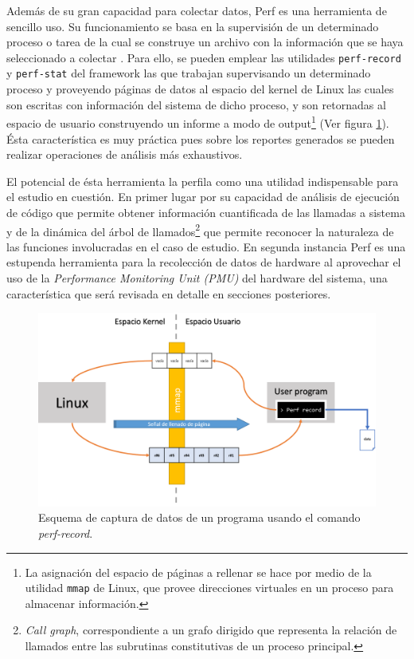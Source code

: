 Además de su gran capacidad para colectar datos, Perf es una herramienta de sencillo uso. Su funcionamiento se basa en la supervisión de un determinado proceso o tarea de la cual se construye un archivo con la información que se haya seleccionado a colectar \cite{article:perf}. Para ello, se pueden emplear las utilidades \verb=perf-record= y \verb=perf-stat= del framework las que trabajan supervisando un determinado proceso y proveyendo páginas de datos al espacio del kernel de Linux las cuales son escritas con información del sistema de dicho proceso, y son retornadas al espacio de usuario construyendo un informe a modo de output\footnote{La asignación del espacio de páginas a rellenar se hace por medio de la utilidad \verb=mmap= de Linux, que provee direcciones virtuales en un proceso para almacenar información.} (Ver figura \ref{fig:perfRecord}). Ésta característica es muy práctica pues sobre los reportes generados se pueden realizar operaciones de análisis más exhaustivos.

El potencial de ésta herramienta la perfila como una utilidad indispensable para el estudio en cuestión. En primer lugar por su capacidad de análisis de ejecución de código que permite obtener información cuantificada de las llamadas a sistema y de la dinámica del árbol de llamados\footnote{\emph{Call graph}, correspondiente a un grafo dirigido que representa la relación de llamados entre las subrutinas constitutivas de un proceso principal.} que permite reconocer la naturaleza de las funciones involucradas en el caso de estudio. En segunda instancia Perf es una estupenda herramienta para la recolección de datos de hardware al aprovechar el uso de la \emph{Performance Monitoring Unit (PMU)} del hardware del sistema, una característica que será revisada en detalle en secciones posteriores.

\begin{figure}[!h]
	\centering
	\includegraphics[scale=.52]{imagenes/perfRecord.png}
	\caption{Esquema de captura de datos de un programa usando el comando \emph{perf-record}.}
	\label{fig:perfRecord}
\end{figure}

